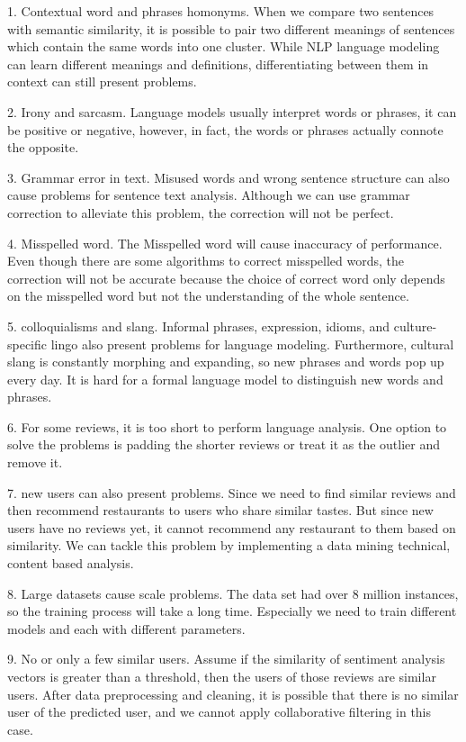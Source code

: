 \documentclass[11pt]{article}
\begin{document}
1. Contextual word and phrases homonyms. When we compare two sentences with semantic similarity, it is possible to pair two different meanings of sentences which contain the same words into one cluster. While NLP language modeling can learn different meanings and definitions, differentiating between them in context can still present problems.

2. Irony and sarcasm. Language models usually interpret words or phrases, it can be positive or negative, however, in fact, the words or phrases actually connote the opposite.

3. Grammar error in text. Misused words and wrong sentence structure can also cause problems for sentence text analysis. Although we can use grammar correction to alleviate this problem, the correction will not be perfect.

4. Misspelled word. The Misspelled word will cause inaccuracy of performance. Even though there are some algorithms to correct misspelled words, the correction will not be accurate because the choice of correct word only depends on the misspelled word but not the understanding of the whole sentence.

5. colloquialisms and slang. Informal phrases, expression, idioms, and culture-specific lingo also present problems for language modeling. Furthermore, cultural slang is constantly morphing and expanding, so new phrases and words pop up every day. It is hard for a formal language model to distinguish new words and phrases.

6. For some reviews, it is too short to perform language analysis. One option to solve the problems is padding the shorter reviews or treat it as the outlier and remove it.

7. new users can also present problems. Since we need to find similar reviews and then recommend restaurants to users who share similar tastes. But since new users have no reviews yet, it cannot recommend any restaurant to them based on similarity. We can tackle this problem by implementing a data mining technical, content based analysis.

8. Large datasets cause scale problems. The data set had over 8 million instances, so the training process will take a long time. Especially we need to train different models and each with different parameters.

9. No or only a few similar users. Assume if the similarity of sentiment analysis vectors is greater than a threshold, then the users of those reviews are similar users. After data preprocessing and cleaning, it is possible that there is no similar user of the predicted user, and we cannot apply collaborative filtering in this case.
\end{document}
